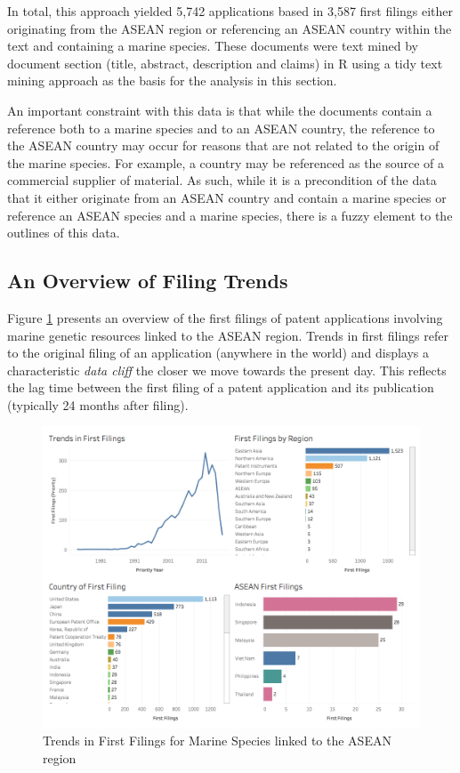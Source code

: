 \documentclass[]{book}
\theoremstyle{definition}
\theoremstyle{definition}
\theoremstyle{definition}
\theoremstyle{remark}
\begin{document}
In total, this approach yielded 5,742 applications based in 3,587 first
filings either originating from the ASEAN region or referencing an ASEAN
country within the text and containing a marine species. These documents
were text mined by document section (title, abstract, description and
claims) in R using a tidy text mining approach as the basis for the
analysis in this section.

An important constraint with this data is that while the documents
contain a reference both to a marine species and to an ASEAN country,
the reference to the ASEAN country may occur for reasons that are not
related to the origin of the marine species. For example, a country may
be referenced as the source of a commercial supplier of material. As
such, while it is a precondition of the data that it either originate
from an ASEAN country and contain a marine species or reference an ASEAN
species and a marine species, there is a fuzzy element to the outlines
of this data.

\hypertarget{an-overview-of-filing-trends}{%
\subsection{An Overview of Filing
Trends}\label{an-overview-of-filing-trends}}

Figure \ref{fig:firstfilings} presents an overview of the first filings
of patent applications involving marine genetic resources linked to the
ASEAN region. Trends in first filings refer to the original filing of an
application (anywhere in the world) and displays a characteristic
\emph{data cliff} the closer we move towards the present day. This
reflects the lag time between the first filing of a patent application
and its publication (typically 24 months after filing).

\begin{figure}

{\centering \includegraphics[width=1\linewidth]{images-patents/first_filings} 

}

\caption{Trends in First Filings for Marine Species linked to the ASEAN region}\label{fig:firstfilings}
\end{figure}
\end{document}
